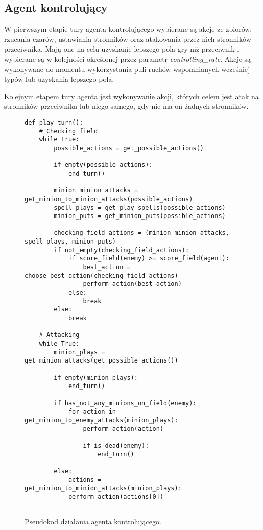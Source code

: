\subsection{Agent kontrolujący}

W pierwszym etapie tury agenta kontrolującego wybierane są akcje ze zbiorów: rzucania czarów, ustawiania stronników oraz atakowania przez nich stronników przeciwnika. Mają one na celu uzyskanie lepszego pola gry niż przeciwnik i wybierane są w kolejności określonej przez parametr \emph{controlling\_rate}. Akcje są wykonywane do momentu wykorzystania puli ruchów wspomnianych wcześniej typów lub uzyskania lepszego pola. 

\noindent Kolejnym etapem tury agenta jest wykonywanie akcji, których celem jest atak na stronników przeciwnika lub niego samego, gdy nie ma on żadnych stronników.

\begin{figure}[H]
	\begin{verbatim}
def play_turn():
	# Checking field
	while True:
		possible_actions = get_possible_actions()
		
		if empty(possible_actions):
			end_turn()
	
		minion_minion_attacks = get_minion_to_minion_attacks(possible_actions)
		spell_plays = get_play_spells(possible_actions)
		minion_puts = get_minion_puts(possible_actions)
		
		checking_field_actions = (minion_minion_attacks, spell_plays, minion_puts)
		if not_empty(checking_field_actions):
			if score_field(enemy) >= score_field(agent):
				best_action = choose_best_action(checking_field_actions)
				perform_action(best_action)
			else:
				break
		else:
			break
			
	# Attacking
	while True:
		minion_plays = get_minion_attacks(get_possible_actions())
		
		if empty(minion_plays):
			end_turn()
	
		if has_not_any_minions_on_field(enemy):
			for action in get_minion_to_enemy_attacks(minion_plays):
				perform_action(action)
			
				if is_dead(enemy):
					end_turn()
					
		else:
			actions = get_minion_to_minion_attacks(minion_plays):
			perform_action(actions[0])
			
	\end{verbatim}
	\caption{Pseudokod działania agenta kontrolującego.}
\end{figure}